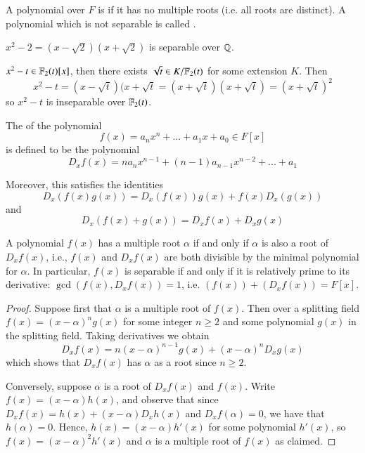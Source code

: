 \documentclass[12pt, a4paper, oneside, openright, titlepage]{book}
\begin{document}
\begin{defn}
    A polynomial over $F$ is  if it has no multiple roots (i.e. all roots are distinct). A polynomial which is not separable is called .
\end{defn}

\begin{eg}
    $x^2-2 = (x-\sqrt{2})(x+\sqrt{2})$ is separable over $\mathbb Q$.
\end{eg}

\begin{eg}
    $x^2 - t \in \mathbb F_2(t)[x]$, then there exists $\sqrt{t} \in K/\mathbb F_2(t)$ for some extension $K$. Then $$x^2-t = (x-\sqrt{t})(x+\sqrt{t} = (x+\sqrt{t})(x+\sqrt{t}) = (x+\sqrt{t})^2$$ so $x^2-t$ is inseparable over $\mathbb F_2(t)$.
\end{eg}


\begin{defn}
    The  of the polynomial \begin{equation*}
        f(x) = a_nx^n+...+a_1x+a_0 \in F[x]
    \end{equation*}
    is defined to be the polynomial \begin{equation*}
        D_xf(x) = na_nx^{n-1}+(n-1)a_{n-1}x^{n-2}+...+a_1
    \end{equation*}
\end{defn}


Moreover, this satisfies the identities \begin{equation*}
    D_x(f(x)g(x)) = D_x(f(x))g(x)+f(x)D_x(g(x))
\end{equation*}
and \begin{equation*}
    D_x(f(x)+g(x)) = D_xf(x)+D_xg(x)
\end{equation*}


\begin{prop}\label{prop:seprel}
    A polynomial $f(x)$ has a multiple root $\alpha$ if and only if $\alpha$ is also a root of $D_xf(x)$, i.e., $f(x)$ and $D_xf(x)$ are both divisible by the minimal polynomial for $\alpha$. In particular, $f(x)$ is separable if and only if it is relatively prime to its derivative: $\gcd(f(x),D_xf(x)) = 1$, i.e. $(f(x))+(D_xf(x)) = F[x]$.
\end{prop}
\begin{proof}
    Suppose first that $\alpha$ is a multiple root of $f(x)$. Then over a splitting field $f(x) = (x-\alpha)^ng(x)$ for some integer $n \geq 2$ and some polynomial $g(x)$ in the splitting field. Taking derivatives we obtain \begin{equation*}
        D_xf(x) = n(x-\alpha)^{n-1}g(x) + (x-\alpha)^nD_xg(x)
    \end{equation*}
    which shows that $D_xf(x)$ has $\alpha$ as a root since $n \geq 2$.

    Conversely, suppose $\alpha$ is a root of $D_xf(x)$ and $f(x)$. Write $f(x) = (x-\alpha)h(x)$, and observe that since $D_xf(x) = h(x) + (x-\alpha)D_xh(x)$ and $D_xf(\alpha) = 0$, we have that $h(\alpha) = 0$. Hence, $h(x) = (x-\alpha)h'(x)$ for some polynomial $h'(x)$, so $f(x) = (x-\alpha)^2h'(x)$ and $\alpha$ is a multiple root of $f(x)$ as claimed.
\end{proof}
\end{document}
